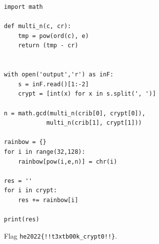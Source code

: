 \begin{verbatim}
import math

def multi_n(c, cr):
    tmp = pow(ord(c), e)
    return (tmp - cr)

   
with open('output','r') as inF:
    s = inF.read()[1:-2]
    crypt = [int(x) for x in s.split(', ')]

n = math.gcd(multi_n(crib[0], crypt[0]),
            multi_n(crib[1], crypt[1]))

rainbow = {}
for i in range(32,128):
    rainbow[pow(i,e,n)] = chr(i)

res = ''
for i in crypt:
    res += rainbow[i]

print(res)
\end{verbatim}
Flag \verb+he2022{!!t3xtb00k_crypt0!!}+.
	









